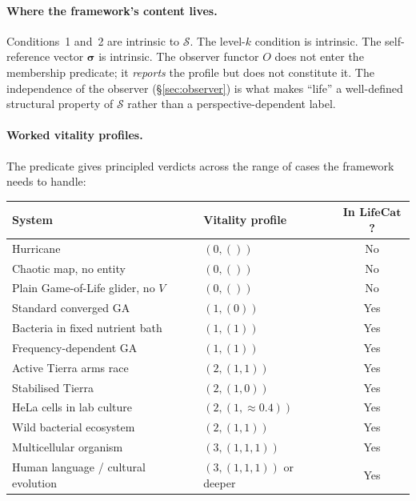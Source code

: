 \documentclass[journal]{IEEEtran}
\theoremstyle{plain}
\theoremstyle{definition}
\theoremstyle{plain}
\begin{document}
\paragraph{Where the framework's content lives.} Conditions~1 and~2
are intrinsic to $\mathcal{S}$. The level-$k$ condition is intrinsic.
The self-reference vector $\boldsymbol{\sigma}$ is intrinsic. The
observer functor $O$ does not enter the membership predicate; it
\emph{reports} the profile but does not constitute it. The
independence of the observer (\S\ref{sec:observer}) is what makes
``life'' a well-defined structural property of $\mathcal{S}$ rather
than a perspective-dependent label.

\paragraph{Worked vitality profiles.} The predicate gives principled
verdicts across the range of cases the framework needs to handle:

\begin{center}
\renewcommand{\arraystretch}{1.15}
\setlength{\tabcolsep}{4pt}
\scriptsize
\begin{tabular}{@{}p{} p{} c@{}}
\hline
\textbf{System} & \textbf{Vitality profile} & \textbf{In $\mathbf{LifeCat}$?} \\
\hline
Hurricane                                    & $(0, ())$                       & No  \\
Chaotic map, no entity                       & $(0, ())$                       & No  \\
Plain Game-of-Life glider, no $V$            & $(0, ())$                       & No  \\
Standard converged GA                        & $(1, (0))$                      & Yes \\
Bacteria in fixed nutrient bath              & $(1, (1))$                      & Yes \\
Frequency-dependent GA                       & $(1, (1))$                      & Yes \\
Active Tierra arms race                      & $(2, (1, 1))$                   & Yes \\
Stabilised Tierra                            & $(2, (1, 0))$                   & Yes \\
HeLa cells in lab culture                    & $(2, (1, \approx 0.4))$         & Yes \\
Wild bacterial ecosystem                     & $(2, (1, 1))$                   & Yes \\
Multicellular organism                       & $(3, (1, 1, 1))$                & Yes \\
Human language / cultural evolution          & $(3, (1, 1, 1))$ or deeper       & Yes \\
\hline
\end{tabular}
\end{center}
\end{document}
